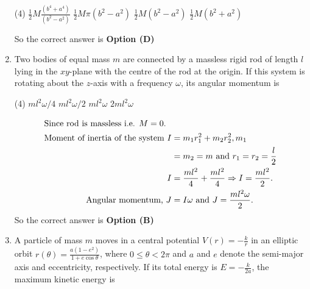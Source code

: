 \begin{enumerate}
\begin{tasks}(4)
\task[\textbf{A.}] $\frac{1}{2} M \frac{\left(b^{4}+a^{4}\right)}{\left(b^{2}-a^{2}\right)}$
\task[\textbf{B.}] $\frac{1}{2} M \pi\left(b^{2}-a^{2}\right)$
\task[\textbf{C.}]  $\frac{1}{2} M\left(b^{2}-a^{2}\right)$
\task[\textbf{D.}] $\frac{1}{2} M\left(b^{2}+a^{2}\right)$
\end{tasks}
\begin{answer}
So the correct answer is \textbf{Option (D)}
\end{answer}
	\item Two bodies of equal mass $m$ are connected by a massless rigid rod of length $l$ lying in the $x y$-plane with the centre of the rod at the origin. If this system is rotating about the $z$-axis with a frequency $\omega$, its angular momentum is

\begin{tasks}(4)
\task[\textbf{A.}] $m l^{2} \omega / 4$
\task[\textbf{B.}] $m l^{2} \omega / 2$
\task[\textbf{C.}] $m l^{2} \omega$
\task[\textbf{D.}]  $2 m l^{2} \omega$
\end{tasks}
\begin{answer}
\begin{align*}
\intertext{Since rod is massless i.e. $M=0$.}
\text{Moment of inertia of the system }I&=m_{1} r_{1}^{2}+m_{2} r_{2}^{2}, m_{1}\\&=m_{2}=m\text{ and }r_{1}=r_{2}=\frac{l}{2}\\
I&=\frac{m l^{2}}{4}+\frac{m l^{2}}{4} \Rightarrow I=\frac{m l^{2}}{2}.\\\text{ Angular momentum, }J&=I \omega\text{ and }J=\frac{m l^{2} \omega}{2}.
\end{align*}
So the correct answer is \textbf{Option (B)}
\end{answer}
	\item A particle of mass $m$ moves in a central potential $V(r)=-\frac{k}{r}$ in an elliptic orbit $r(\theta)=\frac{a\left(1-e^{2}\right)}{1+e \cos \theta}$, where $0 \leq \theta<2 \pi$ and $a$ and $e$ denote the semi-major axis and eccentricity, respectively. If its total energy is $E=-\frac{k}{2 a}$, the maximum kinetic energy is


\end{enumerate}
